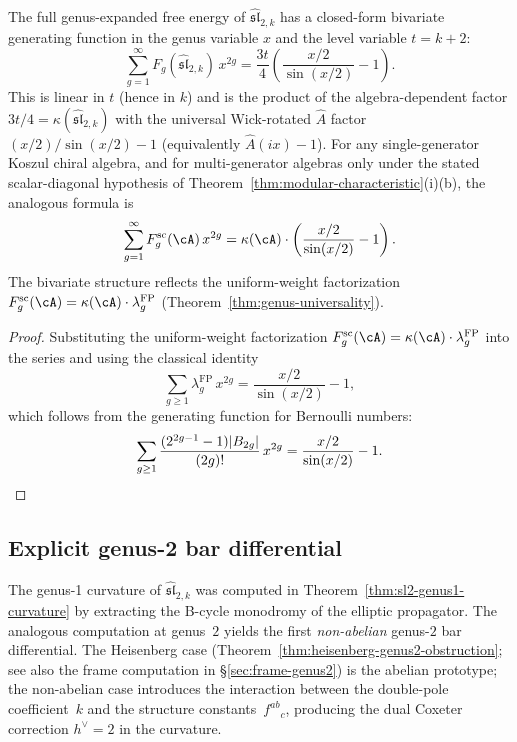 \begin{proposition}
\label{prop:bivariate-gf}
The full genus-expanded free energy of $\widehat{\mathfrak{sl}}_{2,k}$ has a closed-form bivariate generating function in the genus variable $x$ and the level variable $t = k + 2$:
\begin{equation}\label{eq:bivariate-gf}
\sum_{g=1}^{\infty} F_g(\widehat{\mathfrak{sl}}_{2,k})\, x^{2g} = \frac{3t}{4}\left(\frac{x/2}{\sin(x/2)} - 1\right).
\end{equation}
This is linear in $t$ (hence in $k$) and is the product of the
algebra-dependent factor
$3t/4 = \kappa(\widehat{\mathfrak{sl}}_{2,k})$ with the universal
Wick-rotated $\hat{A}$ factor $(x/2)/\sin(x/2)-1$ \textup{(}equivalently
$\hat{A}(ix)-1$\textup{)}. For any single-generator Koszul chiral
algebra, and for multi-generator algebras only under the stated
scalar-diagonal hypothesis of
Theorem~\ref{thm:modular-characteristic}(i)(b), the analogous formula is
\begin{equation}\label{eq:bivariate-gf-general}
\sum_{g=1}^{\infty} F_g^{\mathrm{sc}}(\cA)\, x^{2g}
= \kappa(\cA) \cdot \left(\frac{x/2}{\sin(x/2)} - 1\right).
\end{equation}
The bivariate structure reflects the uniform-weight factorization
$F_g^{\mathrm{sc}}(\cA) = \kappa(\cA) \cdot \lambda_g^{\mathrm{FP}}$
(Theorem~\ref{thm:genus-universality}).
\end{proposition}

\begin{proof}
Substituting the uniform-weight factorization
$F_g^{\mathrm{sc}}(\cA) =
\kappa(\cA) \cdot \lambda_g^{\mathrm{FP}}$ into the series and using
the classical identity
\[
\sum_{g \geq 1} \lambda_g^{\mathrm{FP}}\, x^{2g}
= \frac{x/2}{\sin(x/2)} - 1,
\]
which follows from the generating function for Bernoulli numbers:
\[
\sum_{g \geq 1} \frac{(2^{2g-1}-1)|B_{2g}|}{(2g)!}\, x^{2g}
= \frac{x/2}{\sin(x/2)} - 1. \qedhere
\]
\end{proof}

\subsection{Explicit genus-2 bar differential}\label{subsec:sl2-genus2-bar}

The genus-1 curvature of $\widehat{\mathfrak{sl}}_{2,k}$ was computed in
Theorem~\ref{thm:sl2-genus1-curvature} by extracting the B-cycle
monodromy of the elliptic propagator. The analogous
computation at genus~$2$ yields the first \emph{non-abelian} genus-$2$ bar
differential. The Heisenberg case
(Theorem~\ref{thm:heisenberg-genus2-obstruction}; see also the
frame computation in \S\ref{sec:frame-genus2}) is the abelian prototype;
the non-abelian case introduces the interaction between the double-pole
coefficient~$k$ and the structure constants~$f^{ab}{}_c$,
producing the dual Coxeter correction $h^\vee = 2$ in the curvature.

